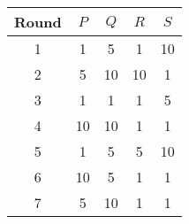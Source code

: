 \begin{tabular}{|c|c|c|c|c|}
   \hline 
   Round & $P$ & $Q$ & $R$ & $S $ \\
   \hline 
   1 & 1 & 5 & 1 & 10 \\
   \hline 
   2 & 5 & 10 & 10 & 1 \\
   \hline 
   3 & 1 & 1 & 1 & 5 \\
   \hline 
   4 & 10 & 10 & 1 & 1 \\
   \hline 
   5 & 1 & 5 & 5 & 10 \\
   \hline 
   6 & 10 & 5 & 1 & 1 \\
   \hline 
   7 & 5 & 10 & 1 & 1 \\
   \hline
   \end{tabular}